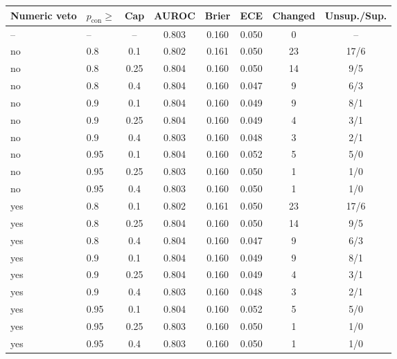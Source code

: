 \begin{tabular}{@{}llcccccc@{}}
\toprule
Numeric veto & $p_{\mathrm{con}}\ge$ & Cap & AUROC & Brier & ECE & Changed & Unsup./Sup. \\
\midrule
-- & -- & -- & 0.803 & 0.160 & 0.050 & 0 & -- \\
no & 0.8 & 0.1 & 0.802 & 0.161 & 0.050 & 23 & 17/6 \\
no & 0.8 & 0.25 & 0.804 & 0.160 & 0.050 & 14 & 9/5 \\
no & 0.8 & 0.4 & 0.804 & 0.160 & 0.047 & 9 & 6/3 \\
no & 0.9 & 0.1 & 0.804 & 0.160 & 0.049 & 9 & 8/1 \\
no & 0.9 & 0.25 & 0.804 & 0.160 & 0.049 & 4 & 3/1 \\
no & 0.9 & 0.4 & 0.803 & 0.160 & 0.048 & 3 & 2/1 \\
no & 0.95 & 0.1 & 0.804 & 0.160 & 0.052 & 5 & 5/0 \\
no & 0.95 & 0.25 & 0.803 & 0.160 & 0.050 & 1 & 1/0 \\
no & 0.95 & 0.4 & 0.803 & 0.160 & 0.050 & 1 & 1/0 \\
yes & 0.8 & 0.1 & 0.802 & 0.161 & 0.050 & 23 & 17/6 \\
yes & 0.8 & 0.25 & 0.804 & 0.160 & 0.050 & 14 & 9/5 \\
yes & 0.8 & 0.4 & 0.804 & 0.160 & 0.047 & 9 & 6/3 \\
yes & 0.9 & 0.1 & 0.804 & 0.160 & 0.049 & 9 & 8/1 \\
yes & 0.9 & 0.25 & 0.804 & 0.160 & 0.049 & 4 & 3/1 \\
yes & 0.9 & 0.4 & 0.803 & 0.160 & 0.048 & 3 & 2/1 \\
yes & 0.95 & 0.1 & 0.804 & 0.160 & 0.052 & 5 & 5/0 \\
yes & 0.95 & 0.25 & 0.803 & 0.160 & 0.050 & 1 & 1/0 \\
yes & 0.95 & 0.4 & 0.803 & 0.160 & 0.050 & 1 & 1/0 \\
\bottomrule
\end{tabular}